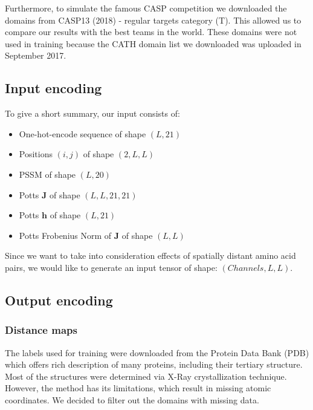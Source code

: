 Furthermore, to simulate the famous CASP competition we downloaded the domains from CASP13 (2018) - regular targets category (T). This allowed us to compare our results with the best teams in the world.
These domains were not used in training because the CATH domain list we downloaded was uploaded in September 2017. 
    
\subsection{Input encoding}
To give a short summary, our input consists of:
    
\begin{itemize}
    \item One-hot-encode sequence of shape $(L, 21)$
    \item Positions $(i, j)$ of shape $(2, L, L)$
    \item PSSM of shape $(L, 20)$
    \item Potts $\bm{J}$ of shape $(L, L, 21, 21)$
    \item Potts $\bm{h}$ of shape $(L, 21)$
    \item Potts Frobenius Norm of $\bm{J}$ of shape $(L, L)$
\end{itemize}
        
Since we want to take into consideration effects of spatially distant amino acid pairs, we would like to generate an input tensor of shape: $(Channels, L, L)$.
    
\subsection{Output encoding}
        
\subsubsection{Distance maps}
The labels used for training were downloaded from the Protein Data Bank (PDB) which offers rich description of many proteins, including their tertiary structure. 
Most of the structures were determined via X-Ray crystallization technique. However, the method has its limitations, which result in missing atomic coordinates. We decided to filter out the domains with missing data. 
        

